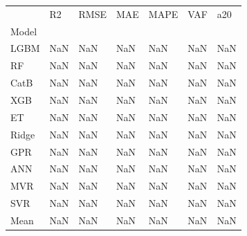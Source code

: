 \begin{tabular}{lllllll}
\toprule
 & R2 & RMSE & MAE & MAPE & VAF & a20 \\
Model &  &  &  &  &  &  \\
\midrule
LGBM & NaN & NaN & NaN & NaN & NaN & NaN \\
RF & NaN & NaN & NaN & NaN & NaN & NaN \\
CatB & NaN & NaN & NaN & NaN & NaN & NaN \\
XGB & NaN & NaN & NaN & NaN & NaN & NaN \\
ET & NaN & NaN & NaN & NaN & NaN & NaN \\
Ridge & NaN & NaN & NaN & NaN & NaN & NaN \\
GPR & NaN & NaN & NaN & NaN & NaN & NaN \\
ANN & NaN & NaN & NaN & NaN & NaN & NaN \\
MVR & NaN & NaN & NaN & NaN & NaN & NaN \\
SVR & NaN & NaN & NaN & NaN & NaN & NaN \\
Mean & NaN & NaN & NaN & NaN & NaN & NaN \\
\bottomrule
\end{tabular}
